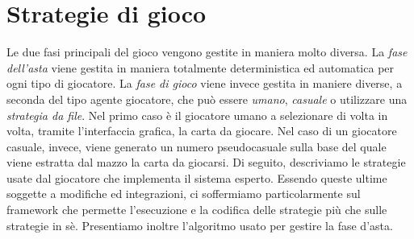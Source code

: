 \chapter*{Strategie di gioco}
\graphicspath{{Chapter4/Chapter4Figs/PNG/}{Chapter4/Chapter4Figs/PDF/}{Chapter4/Chapter4Figs/}}

Le due fasi principali del gioco vengono gestite in maniera molto diversa.
La \emph{fase dell'asta} viene gestita in maniera totalmente deterministica ed automatica per ogni tipo di giocatore.
La \emph{fase di gioco} viene invece gestita in maniere diverse, a seconda del tipo agente giocatore, che può essere \emph{umano}, \emph{casuale} o utilizzare una \emph{strategia da file}.
Nel primo caso è il giocatore umano a selezionare di volta in volta, tramite l'interfaccia grafica, la carta da giocare.
Nel caso di un giocatore casuale, invece, viene generato un numero pseudocasuale sulla base del quale viene estratta dal mazzo la carta da giocarsi.
Di seguito, descriviamo le strategie usate dal giocatore che implementa il sistema esperto.
Essendo queste ultime soggette a modifiche ed integrazioni, ci soffermiamo particolarmente sul framework che permette l'esecuzione e la codifica delle strategie più che sulle strategie in sè.
Presentiamo inoltre l'algoritmo usato per gestire la fase d'asta.



